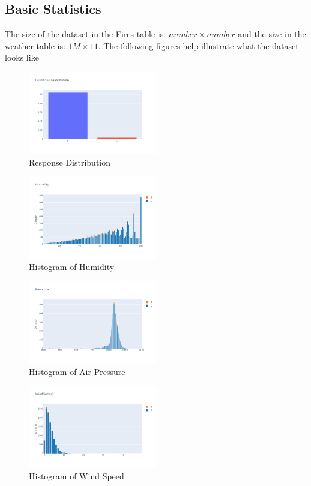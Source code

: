 \documentclass[10pt]{article}
\begin{document}
\subsection{Basic Statistics}
The size of the dataset in the Fires table is: $number \times number$ and
the size in the weather table is: $1M \times 11$. The following figures
help illustrate what the dataset looks like\par
\begin{figure}[H]
    \centering
    \includegraphics[width=0.5\textwidth]{../res/eda1.png}
    \caption{Response Distribution}
\end{figure}
\begin{figure}[H]
    \centering
    \includegraphics[width=0.5\textwidth]{../res/eda2.png}
    \caption{Histogram of Humidity}
\end{figure}
\begin{figure}[H]
    \centering
    \includegraphics[width=0.5\textwidth]{../res/eda3.png}
    \caption{Histogram of Air Pressure}
\end{figure}
\begin{figure}[H]
    \centering
    \includegraphics[width=0.5\textwidth]{../res/eda5.png}
    \caption{Histogram of Wind Speed}
\end{figure}
\end{document}
